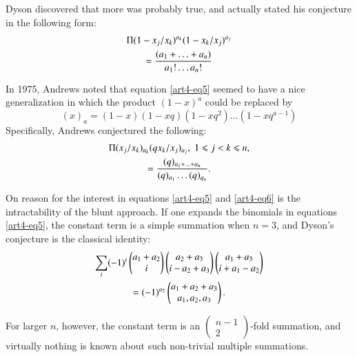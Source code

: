 Dyson discovered that more was probably true, and actually stated his conjecture in the following form:
\begin{gather}
[x^0] \Pi (1-x_j/x_k)^{a_k} (1-x_k/x_j)^{a_j} \label{art4-eq5}\\
= \frac{(a_1+ \ldots + a_n)}{a_1 !\ldots a_n!} \notag
\end{gather}

In 1975, Andrews \cite{art4-key1} noted that equation \eqref{art4-eq5} seemed to have a nice generalization in which the product $(1-x)^a$ could be replaced by 
$$
(x)_a = (1-x) (1-xq) (1-xq^2) \ldots (1-xq^{a-1})
$$
Specifically, Andrews conjectured the following:
\begin{gather}
[x^0] \Pi (x_j/x_k)_{a_k} (qx_k/x_j)_{a_j}, \; 1 \leqslant j < k \leqslant n,  \label{art4-eq6}\\
=\frac{(q)_{a_1+ \ldots + a_n}}{(q)_{a_1} \ldots (q)_{q_n}} . \notag
\end{gather}

On reason for the interest in equations \eqref{art4-eq5} and \eqref{art4-eq6} is the intractability of the blunt approach. If one expands the binomials in equations \eqref{art4-eq5}, the constant term is a simple summation when $n=3$, and Dyson's conjecture is the classical identity:
\begin{gather}
\sum\limits_i (-1)^i \begin{pmatrix}
a_1 +a_2\\i
\end{pmatrix} \begin{pmatrix}
a_2+ a_3\\
i - a_2 + a_3
\end{pmatrix} 
\begin{pmatrix}
a_1 + a_3\\
i+a_1 -a_2
\end{pmatrix} \label{art4-eq7}\\
= (-1)^{a_2} 
\begin{pmatrix}
a_1 + a_2 + a_3\\
a_1, a_2, a_3
\end{pmatrix}. \notag
\end{gather}

For larger $n$, however, the constant term is an $\left(\begin{smallmatrix}
n-1\\2\end{smallmatrix} \right)$-fold summation, and virtually nothing is known about such non-trivial multiple summations.

